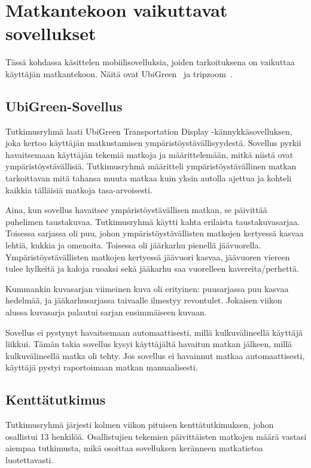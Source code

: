 \documentclass[finnish]{tktltiki2}
\theoremstyle{definition}
\theoremstyle{remark}
\begin{document}
\section{Matkantekoon vaikuttavat sovellukset}

Tässä kohdassa käsittelen mobiilisovelluksia, joiden tarkoituksena on vaikuttaa käyttäjän matkantekoon. Näitä ovat UbiGreen~\cite{ubigreen} ja tripzoom~\cite{tripzoom}.

\subsection{UbiGreen-Sovellus}

Tutkimusryhmä laati UbiGreen Transportation Display -kännykkäsovelluksen, joka kertoo käyttäjän matkustamisen ympäristöystävällisyydestä. Sovellus pyrkii havaitsemaan käyttäjän tekemiä matkoja ja määrittelemään, mitkä niistä ovat ympäristöystävällisiä. Tutkimusryhmä määritteli ympäristöystävällinen matkan tarkoittavan mitä tahansa muuta matkaa kuin yksin autolla ajettua ja kohteli kaikkia tälläisiä matkoja tasa-arvoisesti.

Aina, kun sovellus havaitsee ympäristöystävällisen matkan, se päivittää puhelimen taustakuvaa. Tutkimusryhmä käytti kahta erilaista taustakuvasarjaa. Toisessa sarjassa oli puu, johon ympäristöystävällisten matkojen kertyessä kasvaa lehtiä, kukkia ja omenoita. Toisessa oli jäärkarhu pienellä jäävuorella. Ympäristöystävällisten matkojen kertyessä jäävuori kasvaa, jäävuoren viereen tulee hylkeitä ja kaloja ruoaksi sekä jääkarhu saa vuorelleen kavereita/perhettä.

Kummankin kuvasarjan viimeinen kuva oli erityinen: puusarjassa puu kasvaa hedelmää, ja jääkarhusarjassa taivaalle ilmestyy revontulet. Jokaisen viikon alussa kuvasarja palautui sarjan ensimmäiseen kuvaan.

Sovellus ei pystynyt havaitsemaan automaattisesti, millä kulkuvälineellä käyttäjä liikkui. Tämän takia sovellus kysyi käyttäjältä havaitun matkan jälkeen, millä kulkuvälineellä matka oli tehty. Jos sovellus ei havainnut matkaa automaattisesti, käyttäjä pystyi raportoimaan matkan manuaalisesti.

\subsection{Kenttätutkimus}
Tutkimusryhmä järjesti kolmen viikon pituisen kenttätutkimuksen, johon osallistui 13 henkilöä. Osallistujien tekemien päivittäisten matkojen määrä vastasi aiempaa tutkimusta, mikä osoittaa sovelluksen keränneen matkatietoa luotettavasti.
\end{document}
